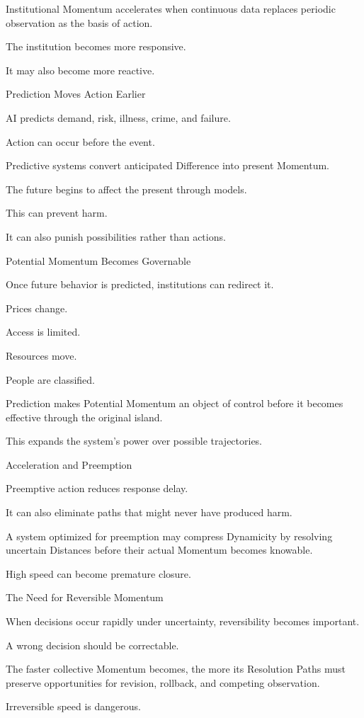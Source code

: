 Institutional Momentum accelerates when continuous data replaces periodic observation as the basis of action.

The institution becomes more responsive.

It may also become more reactive.

Prediction Moves Action Earlier

AI predicts demand, risk, illness, crime, and failure.

Action can occur before the event.

Predictive systems convert anticipated Difference into present Momentum.

The future begins to affect the present through models.

This can prevent harm.

It can also punish possibilities rather than actions.

Potential Momentum Becomes Governable

Once future behavior is predicted, institutions can redirect it.

Prices change.

Access is limited.

Resources move.

People are classified.

Prediction makes Potential Momentum an object of control before it becomes effective through the original island.

This expands the system’s power over possible trajectories.

Acceleration and Preemption

Preemptive action reduces response delay.

It can also eliminate paths that might never have produced harm.

A system optimized for preemption may compress Dynamicity by resolving uncertain Distances before their actual Momentum becomes knowable.

High speed can become premature closure.

The Need for Reversible Momentum

When decisions occur rapidly under uncertainty, reversibility becomes important.

A wrong decision should be correctable.

The faster collective Momentum becomes, the more its Resolution Paths must preserve opportunities for revision, rollback, and competing observation.

Irreversible speed is dangerous.

